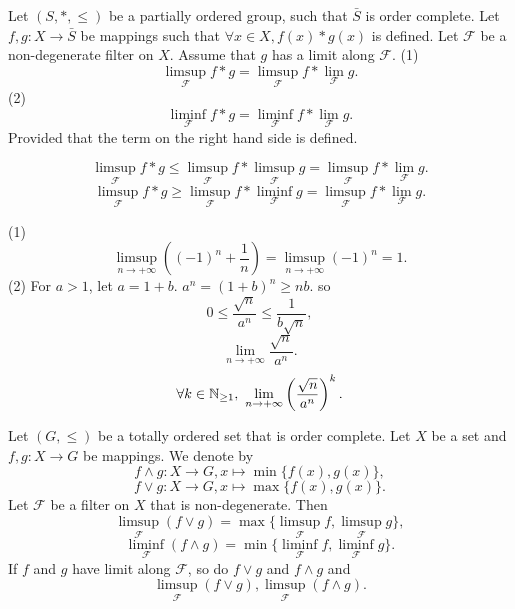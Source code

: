 \begin{corollaryenv}
    Let $(S,*,\le)$ be a partially ordered group, such that $\bar{S}$ is order complete. Let $f,g: X\longrightarrow \bar{S}$ be mappings such that $\forall x\in X, f(x)*g(x)$ is defined. Let $\mathcal{F}$ be a  non-degenerate filter on $X$. Assume that $g$ has a limit along $\mathcal{F}$.
    \newline
    (1) $$\limsup_{\mathcal{F}}f*g=\limsup_{\mathcal{F}}f*\lim_{\mathcal{F}}g.$$
    (2) $$\liminf_{\mathcal{F}}f*g=\liminf_{\mathcal{F}}f*\lim_{\mathcal{F}}g.$$
    Provided that the term on the right hand side is defined.
\end{corollaryenv}
\begin{proofenv}
 $$\limsup_{\mathcal{F}}f*g\le \limsup_{\mathcal{F}}f*\limsup_{\mathcal{F}}g=\limsup_{\mathcal{F}}f*\lim_{\mathcal{F}}g.$$
    $$\limsup_{\mathcal{F}}f*g\ge \limsup_{\mathcal{F}}f*\liminf_{\mathcal{F}}g=\limsup_{\mathcal{F}}f*\lim_{\mathcal{F}}g.$$
\end{proofenv}
\begin{exampleenv}
    \quad \newline
    (1)
    $$\limsup_{n\rightarrow+\infty}\left((-1)^n+\frac{1}{n}\right)=\limsup_{n\rightarrow+\infty}(-1)^n=1.$$
    (2) For $a>1$, let $a=1+b$. $a^n=(1+b)^n\ge nb$. so 
    $$0\le \frac{\sqrt{n}}{a^n}\le \frac{1}{b\sqrt{n}},$$
    $$\lim_{n\rightarrow +\infty}\frac{\sqrt{n}}{a^n}.$$
    $$\forall k\in \NN_{\ge 1}, \ \lim_{n\rightarrow+\infty}\left(\frac{\sqrt{n}}{a^n}\right)^k.$$
\end{exampleenv}
\begin{propositionenv}
    Let $(G,\le)$ be a totally ordered set that is order complete. Let $X$ be a set and $f,g:X\longrightarrow G$ be mappings. We denote by 
    $$f\wedge g:X\longrightarrow G, x\longmapsto \min\{f(x),g(x)\},$$
    $$f\vee g:X\longrightarrow G, x\longmapsto \max\{f(x),g(x)\}.$$
    Let $\mathcal{F}$ be a filter on $X$ that is non-degenerate. Then 
    $$\limsup_\mathcal{F}\left(f\vee g\right)=\max\{\limsup_\mathcal{F} f,\limsup_\mathcal{F} g\},$$
    $$\liminf_\mathcal{F}\left(f\wedge g\right)=\min\{\liminf_\mathcal{F} f,\liminf_\mathcal{F} g\}.$$
    If $f$ and $g$ have limit along $\mathcal{F}$, so do $f\vee g$ and $f \wedge g$ and $$\limsup_\mathcal{F}\left(f\vee g\right),\limsup_\mathcal{F}\left(f\wedge g\right).$$
\end{propositionenv}
